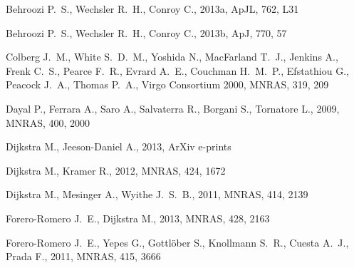 \documentclass[usenatbib]{mn2e}
\newcommand{\apj}{ApJ}
\newcommand{\apjl}{ApJL}
\newcommand{\mnras}{MNRAS}
\begin{document}

\begin{thebibliography}{}

{Behroozi} P.~S.,  {Wechsler} R.~H.,    {Conroy} C.,  2013a, \apjl, 762, L31

{Behroozi} P.~S.,  {Wechsler} R.~H.,    {Conroy} C.,  2013b, \apj, 770, 57

{Colberg} J.~M.,  {White} S.~D.~M.,  {Yoshida} N.,  {MacFarland} T.~J.,
  {Jenkins} A.,  {Frenk} C.~S.,  {Pearce} F.~R.,  {Evrard} A.~E.,  {Couchman}
  H.~M.~P.,  {Efstathiou} G.,  {Peacock} J.~A.,  {Thomas} P.~A.,    {Virgo
  Consortium} 2000, \mnras, 319, 209

{Dayal} P.,  {Ferrara} A.,  {Saro} A.,  {Salvaterra} R.,  {Borgani} S.,
  {Tornatore} L.,  2009, \mnras, 400, 2000

{Dijkstra} M.,  {Jeeson-Daniel} A.,  2013, ArXiv e-prints

{Dijkstra} M.,  {Kramer} R.,  2012, \mnras, 424, 1672

{Dijkstra} M.,  {Mesinger} A.,    {Wyithe} J.~S.~B.,  2011, \mnras, 414, 2139

{Forero-Romero} J.~E.,  {Dijkstra} M.,  2013, \mnras, 428, 2163

{Forero-Romero} J.~E.,  {Yepes} G.,  {Gottl{\"o}ber} S.,  {Knollmann} S.~R.,
  {Cuesta} A.~J.,    {Prada} F.,  2011, \mnras, 415, 3666


\end{thebibliography}
\end{document}
